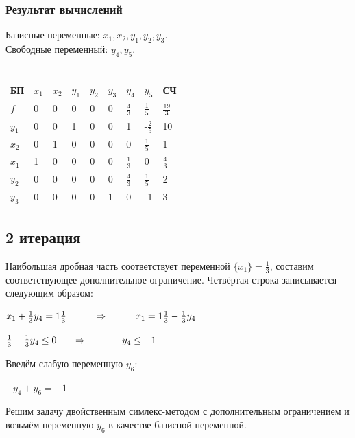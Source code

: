 \documentclass[14pt,a4paper,fleqn]{extarticle}
\begin{document}
	\subsubsection*{Результат вычислений}
	Базисные переменные: $x_1, x_2, y_1, y_2, y_3$.\\
	Свободные переменный: $y_4, y_5$.\\\\
	\begin{tabularx}{\textwidth}{V{1}p{0.7cm}V{1}p{1.3cm}V{1}p{1.34cm}V{1}p{1.3cm}V{1}p{1.3cm}V{1}p{1.3cm}V{1}p{1.3cm}V{1}p{1.3cm}V{1}p{1.33cm}V{1}}
		\hline
		БП & $x_1$ & $x_2$ & $y_1$ & $y_2$ & $y_3$ & $y_4$ & $y_5$ & СЧ\\
		\hline
		$f$ & 0 & 0 & 0 & 0 & 0 & \small $\frac{4}{3}$ & \small $\frac{1}{5}$ & \small $\frac{19}{3}$\\
		\hline
		$y_1$ & 0 & 0 & 1 & 0 & 0 & 1 & \small -$\frac{2}{5}$ & 10\\
		\hline
		$x_2$ & 0 & 1 & 0 & 0 & 0 & 0 & \small $\frac{1}{5}$ & 1\\
		\hline
		$x_1$ & 1 & 0 & 0 & 0 & 0 & \small $\frac{1}{3}$ & 0 & \small $\frac{4}{3}$\\
		\hline
		$y_2$ & 0 & 0 & 0 & 0 & 0 & \small $\frac{4}{3}$ & \small $\frac{1}{5}$ & 2\\
		\hline
		$y_3$ & 0 & 0 & 0 & 0 & 1 & 0 & -1 & 3\\
		\hline
	\end{tabularx}
	\newpage
	\subsection*{2 итерация}
	Наибольшая дробная часть соответствует переменной $\{x_1\} = \frac{1}{3}$, составим соответствующее дополнительное ограничение. Четвёртая строка записывается следующим образом:
	\begin{center}
		$x_1 + \frac{1}{3}y_4 = 1\frac{1}{3} \hspace*{1cm} \Rightarrow \hspace*{1cm} x_1 = 1\frac{1}{3} - \frac{1}{3}y_4$
	\end{center}
	\begin{center}
		$\frac{1}{3} - \frac{1}{3}y_4 \leq 0 \hspace*{0.6cm} \Rightarrow \hspace*{1cm} -y_4 \leq -1$
	\end{center}
	Введём слабую переменную $y_6$:
	\begin{center}
		$-y_4 + y_6 = -1$
	\end{center}
	Решим задачу двойственным симлекс-методом с дополнительным ограничением и возьмём переменную $y_6$ в качестве базисной переменной.
\end{document}
